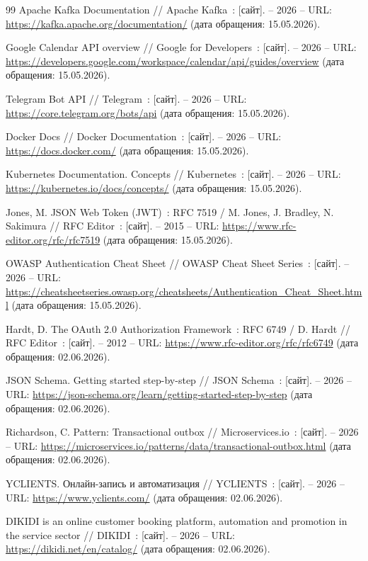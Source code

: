 \begin{thebibliography}{99}
     Apache Kafka Documentation // Apache Kafka~: [сайт]. -- 2026 -- URL: \url{https://kafka.apache.org/documentation/} (дата обращения: 15.05.2026).

     Google Calendar API overview // Google for Developers~: [сайт]. -- 2026 -- URL: \url{https://developers.google.com/workspace/calendar/api/guides/overview} (дата обращения: 15.05.2026).

     Telegram Bot API // Telegram~: [сайт]. -- 2026 -- URL: \url{https://core.telegram.org/bots/api} (дата обращения: 15.05.2026).

     Docker Docs // Docker Documentation~: [сайт]. -- 2026 -- URL: \url{https://docs.docker.com/} (дата обращения: 15.05.2026).

     Kubernetes Documentation. Concepts // Kubernetes~: [сайт]. -- 2026 -- URL: \url{https://kubernetes.io/docs/concepts/} (дата обращения: 15.05.2026).

     Jones, M. JSON Web Token (JWT)~: RFC 7519 / M. Jones, J. Bradley, N. Sakimura // RFC Editor~: [сайт]. -- 2015 -- URL: \url{https://www.rfc-editor.org/rfc/rfc7519} (дата обращения: 15.05.2026).

     OWASP Authentication Cheat Sheet // OWASP Cheat Sheet Series~: [сайт]. -- 2026 -- URL: \url{https://cheatsheetseries.owasp.org/cheatsheets/Authentication_Cheat_Sheet.html} (дата обращения: 15.05.2026).

     Hardt, D. The OAuth 2.0 Authorization Framework~: RFC 6749 / D. Hardt // RFC Editor~: [сайт]. -- 2012 -- URL: \url{https://www.rfc-editor.org/rfc/rfc6749} (дата обращения: 02.06.2026).

     JSON Schema. Getting started step-by-step // JSON Schema~: [сайт]. -- 2026 -- URL: \url{https://json-schema.org/learn/getting-started-step-by-step} (дата обращения: 02.06.2026).

     Richardson, C. Pattern: Transactional outbox // Microservices.io~: [сайт]. -- 2026 -- URL: \url{https://microservices.io/patterns/data/transactional-outbox.html} (дата обращения: 02.06.2026).

     YCLIENTS. Онлайн-запись и автоматизация // YCLIENTS~: [сайт]. -- 2026 -- URL: \url{https://www.yclients.com/} (дата обращения: 02.06.2026).

     DIKIDI is an online customer booking platform, automation and promotion in the service sector // DIKIDI~: [сайт]. -- 2026 -- URL: \url{https://dikidi.net/en/catalog/} (дата обращения: 02.06.2026).


\end{thebibliography}
